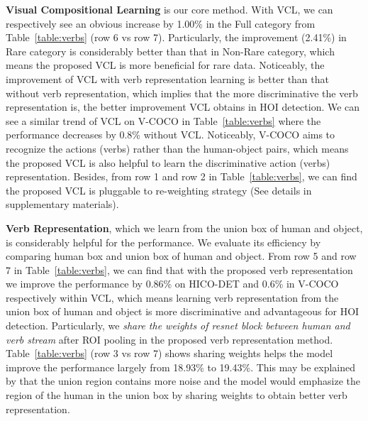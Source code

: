 \documentclass[runningheads]{llncs}
\begin{document}
{\bf Visual Compositional Learning} is our core method.
With VCL, we can respectively see an obvious increase by 1.00\% in the Full category from Table~\ref{table:verbs} (row 6 vs row 7).
Particularly, the improvement (2.41\%) in Rare category is considerably better than that in Non-Rare category,
which means the proposed VCL is more beneficial for rare data. Noticeably, the improvement of VCL with verb representation learning is better than that without verb representation, which implies that the more discriminative the verb representation is, the better improvement VCL obtains in HOI detection.
We can see a similar trend of VCL on V-COCO in Table~\ref{table:verbs} where the performance decreases by 0.8\% without VCL.
Noticeably, V-COCO aims to recognize the actions (verbs)
rather than the human-object pairs, which means the proposed VCL is also helpful to learn the discriminative action (verbs) representation. Besides, from row 1 and row 2 in Table~\ref{table:verbs}, we can find the proposed VCL is pluggable to re-weighting strategy \cite{japkowicz2002class} (See details in supplementary materials).

{\bf Verb Representation}, which we learn from the union box of human and object, is considerably helpful for the performance. We evaluate its efficiency by comparing human box and union box of human and object.
From row 5 and row 7 in Table~\ref{table:verbs}, we can find that with the proposed verb representation we improve the performance by 0.86\% on HICO-DET and 0.6\% in V-COCO respectively within VCL, which means learning verb representation from the union box of human and object is more discriminative and advantageous for HOI detection. Particularly, we \textit{share the weights of resnet block between human and verb stream} after ROI pooling in the proposed verb representation method. Table~\ref{table:verbs} (row 3 vs row 7) shows sharing weights helps the model improve the performance largely from 18.93\% to 19.43\%. This may be explained by that the union region contains more noise and the model would emphasize the region of the human in the union box by sharing weights to obtain better verb representation.
\end{document}
